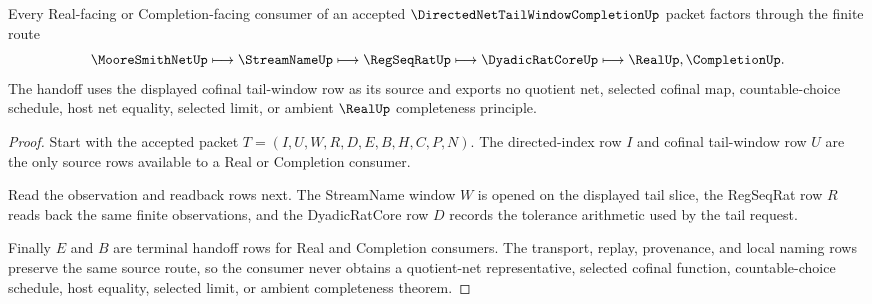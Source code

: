 \begin{theorem}
\label{thm:directed-net-tail-window-completion-handoff}
Every Real-facing or Completion-facing consumer of an accepted $\DirectedNetTailWindowCompletionUp$ packet factors through the finite route
$$
\MooreSmithNetUp \longmapsto
\StreamNameUp \longmapsto
\RegSeqRatUp \longmapsto
\DyadicRatCoreUp \longmapsto
\RealUp,\CompletionUp .
$$
The handoff uses the displayed cofinal tail-window row as its source and exports no quotient net, selected cofinal map, countable-choice schedule, host net equality, selected limit, or ambient $\RealUp$ completeness principle.
\end{theorem}
\begin{proof}
Start with the accepted packet $T=(I,U,W,R,D,E,B,H,C,P,N)$. The directed-index row $I$ and cofinal tail-window row $U$ are the only source rows available to a Real or Completion consumer.

Read the observation and readback rows next. The StreamName window $W$ is opened on the displayed tail slice, the RegSeqRat row $R$ reads back the same finite observations, and the DyadicRatCore row $D$ records the tolerance arithmetic used by the tail request.

Finally $E$ and $B$ are terminal handoff rows for Real and Completion consumers. The transport, replay, provenance, and local naming rows preserve the same source route, so the consumer never obtains a quotient-net representative, selected cofinal function, countable-choice schedule, host equality, selected limit, or ambient completeness theorem.
\end{proof}




